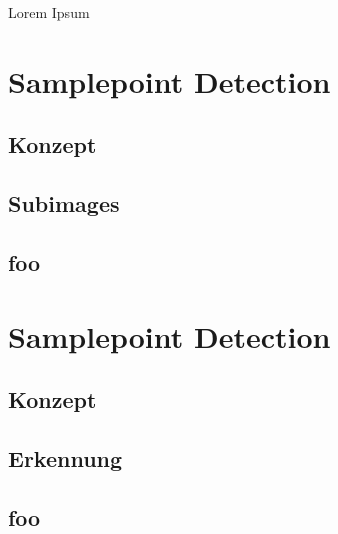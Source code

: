 Lorem Ipsum
\section{Samplepoint Detection}

\subsection{Konzept}
\label{sec:subimage_konzept}

\subsection{Subimages}
\label{sec:subimages}

\subsection{foo}
\label{sec:subimage_foo}

\section{Samplepoint Detection}

\subsection{Konzept}
\label{sec:samplepoint_konzept}

\subsection{Erkennung}
\label{sec:samplepoint_erkennung}

\subsection{foo}
\label{sec:samplepoint_foo}
